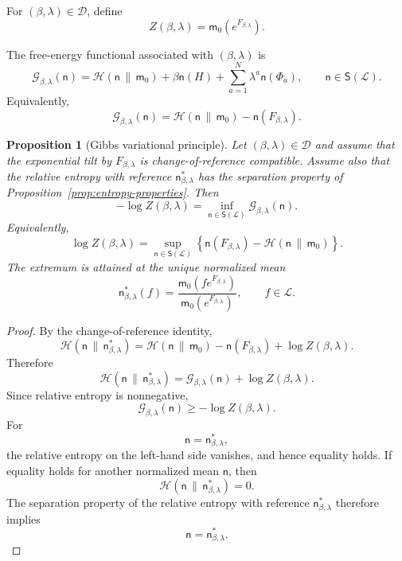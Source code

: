 \documentclass[10pt,a4paper]{amsart}
\newtheorem{Proposition}[Theorem]{Proposition}
\begin{document}
For $(\beta,\lambda)\in\mathcal D$, define
\[
Z(\beta,\lambda)
=
\mathsf m_0\left(e^{F_{\beta,\lambda}}\right).
\]

The free-energy functional associated with $(\beta,\lambda)$ is
\[
\mathcal G_{\beta,\lambda}(\mathsf n)
=
\mathcal H(\mathsf n\,\|\,\mathsf m_0)
+
\beta\mathsf n(H)
+
\sum_{a=1}^{N}\lambda^a\mathsf n(\Phi_a),
\qquad
\mathsf n\in\mathsf S(\mathcal L).
\]
Equivalently,
\[
\mathcal G_{\beta,\lambda}(\mathsf n)
=
\mathcal H(\mathsf n\,\|\,\mathsf m_0)
-
\mathsf n(F_{\beta,\lambda}).
\]

\begin{Proposition}[Gibbs variational principle]
\label{prop:gibbs-variational-principle}
Let $(\beta,\lambda)\in\mathcal D$ and assume that the exponential tilt
by $F_{\beta,\lambda}$ is change-of-reference compatible. Assume also
that the relative entropy with reference
$\mathsf n_{\beta,\lambda}^*$ has the separation property of
Proposition~\ref{prop:entropy-properties}. Then
\[
-\log Z(\beta,\lambda)
=
\inf_{\mathsf n\in\mathsf S(\mathcal L)}
\mathcal G_{\beta,\lambda}(\mathsf n).
\]
Equivalently,
\[
\log Z(\beta,\lambda)
=
\sup_{\mathsf n\in\mathsf S(\mathcal L)}
\left\{
\mathsf n(F_{\beta,\lambda})
-
\mathcal H(\mathsf n\,\|\,\mathsf m_0)
\right\}.
\]
The extremum is attained at the unique normalized mean
\[
\mathsf n_{\beta,\lambda}^{*}(f)
=
\frac{
\mathsf m_0\left(fe^{F_{\beta,\lambda}}\right)
}{
\mathsf m_0\left(e^{F_{\beta,\lambda}}\right)
},
\qquad
f\in\mathcal L.
\]
\end{Proposition}

\begin{proof}
By the change-of-reference identity,
\[
\mathcal H\left(
\mathsf n\,\|\,\mathsf n_{\beta,\lambda}^{*}
\right)
=
\mathcal H(\mathsf n\,\|\,\mathsf m_0)
-\mathsf n(F_{\beta,\lambda})
+\log Z(\beta,\lambda).
\]
Therefore
\[
\mathcal H\left(
\mathsf n\,\|\,\mathsf n_{\beta,\lambda}^{*}
\right)
=
\mathcal G_{\beta,\lambda}(\mathsf n)
+\log Z(\beta,\lambda).
\]
Since relative entropy is nonnegative,
\[
\mathcal G_{\beta,\lambda}(\mathsf n)
\geq
-\log Z(\beta,\lambda).
\]
For
\[
\mathsf n=\mathsf n_{\beta,\lambda}^{*},
\]
the relative entropy on the left-hand side vanishes, and hence equality
holds. If equality holds for another normalized mean $\mathsf n$, then
\[
\mathcal H\left(
\mathsf n\,\|\,\mathsf n_{\beta,\lambda}^{*}
\right)=0.
\]
The separation property of the relative entropy with reference
$\mathsf n_{\beta,\lambda}^{*}$ therefore implies
\[
\mathsf n=\mathsf n_{\beta,\lambda}^{*}.
\]
\end{proof}
\end{document}
